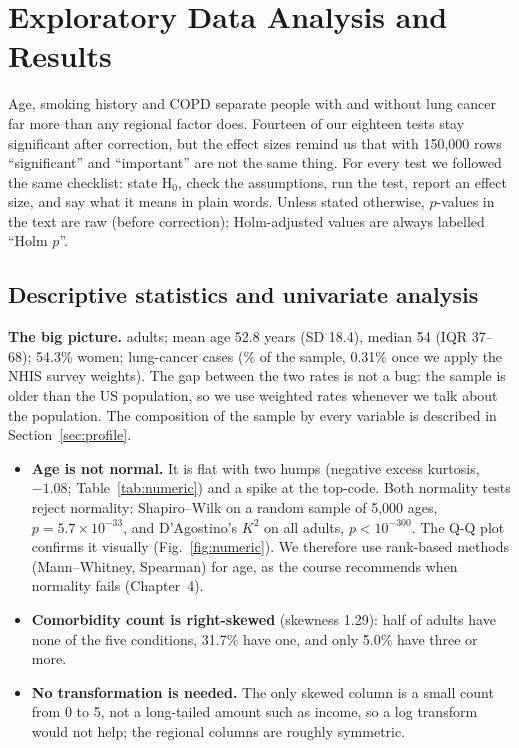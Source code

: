 \section{Exploratory Data Analysis and Results}\label{sec:eda}

Age, smoking history and COPD separate people with and without lung cancer far more than any regional factor does. Fourteen of our eighteen tests stay significant after correction, but the effect sizes remind us that with 150,000 rows ``significant'' and ``important'' are not the same thing. For every test we followed the same checklist: state H$_0$, check the assumptions, run the test, report an effect size, and say what it means in plain words. Unless stated otherwise, $p$-values in the text are raw (before correction); Holm-adjusted values are always labelled ``Holm $p$''.

\subsection{Descriptive statistics and univariate analysis}\label{sec:univariate}

\textbf{The big picture.} \nAdults adults; mean age 52.8 years (SD 18.4), median 54 (IQR 37--68); 54.3\% women; \nCases lung-cancer cases (\sampleRate\% of the sample, 0.31\% once we apply the NHIS survey weights). The gap between the two rates is not a bug: the sample is older than the US population, so we use weighted rates whenever we talk about the population. The composition of the sample by every variable is described in Section~\ref{sec:profile}.

\begin{itemize}
  \item \textbf{Age is not normal.} It is flat with two humps (negative excess kurtosis, $-1.08$; Table~\ref{tab:numeric}) and a spike at the top-code. Both normality tests reject normality: Shapiro--Wilk on a random sample of 5,000 ages, $p = 5.7 \times 10^{-33}$, and D'Agostino's $K^2$ on all adults, $p < 10^{-300}$. The Q-Q plot confirms it visually (Fig.~\ref{fig:numeric}). We therefore use rank-based methods (Mann--Whitney, Spearman) for age, as the course recommends when normality fails (Chapter~4).
  \item \textbf{Comorbidity count is right-skewed} (skewness 1.29): half of adults have none of the five conditions, 31.7\% have one, and only 5.0\% have three or more.
  \item \textbf{No transformation is needed.} The only skewed column is a small count from 0 to 5, not a long-tailed amount such as income, so a log transform would not help; the regional columns are roughly symmetric.
\end{itemize}

